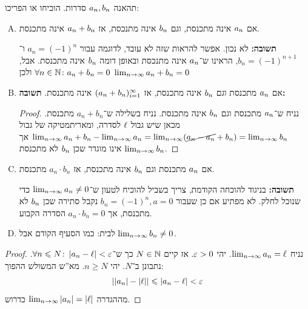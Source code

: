 \documentclass[name=רשימות חשבון דיפרנציאלי ואינטגרלי 1א]{../../../tex/classes/megasumPreamble}
\begin{document}
	
	תהאנה $a_n, b_n$ סדרות. הוכיחו או הפריכו:
	\begin{enumerate}[A.]
		\item אם $a_n$ אינה מתכנסת, וגם $b_n$ אינה מתנכסת, אז $a_n + b_n$ אינה מתכנסת.

		\textbf{תשובה: }לא נכון. אפשר להראות שזה לא עובד, לדוגמה עבור $a_n = (-1)^{n}$ ו־$b_n = (-1)^{n + 1}$, הראינו ש־$a_n$ אינה מתנכסת ובאופן דומה $b_n$ אינה מתכנסת. אבל, $\forall n \in \mathbb{N} \colon a_n + b_n = 0$ ולכן $\lim_{n \to \infty} a_n + b_n = 0$

		\item אם $a_n$ מתכנסת וגם $b_n$ אינה מתכנסת, אז $(a_n + b_n)_{i = 1}^{\infty}$ אינה מתכנסת. \textbf{תשובה: }

		\begin{proof}
			נניח ש־$a_n$ מתכנסת וגם $b_n$ אינה מתכנסת. נניח בשלילה ש־$a_n + b_n$ מתכנסת. מכאן שיש גבול $\ell$ לסדרה, ומאריתמטיקה של גבול $\lim_{n \to \infty} a_n + b_n - \lim_{n \to \infty} a_n = \lim_{n \to \infty} (\cancel{a_n - a_n} + b_n) = \lim_{n \to \infty} b_n$ אך $\lim_{n \to \infty} b_n$ אינו מוגדר שכן $b_n$ לא מתכנסת.
		\end{proof}
		\item אם $a_n$ מתכנסת וגם $b_n$ אינה מתכנסת, אז $a_n \cdot b_n$ מתכנסת.

		\textbf{תשובה: }בניגוד להוכחה הקודמת, צריך בשביל להוכיח לטעון ש־$\lim_{n \to \infty} a_n \neq 0$ כדי שנוכל לחלק. לא מפתיע אם כן שעבור $b_n = (-1)^{n}, a = 0$ נקבל סתירה שכן $b_n$ לא מתכנסת, אך $a_n \cdot b_n = 0$ הסדרה הקבוע.

		\item לבית: כמו הסעיף הקודם אבל $\lim_{n \to \infty} b_n \neq 0$.
	\end{enumerate}

	\begin{proof}
		נניח $\lim_{n \to \infty} a_n = \ell$. יהי $\eg > 0$. אז קיים $N \in \mathbb{N}$ כך ש־$\forall n \le N \co \sof {a_n - \ml} < \eg$. נתבונן ב־$N$. יהי $n \ge N$. מא''ש המשולש ההפוך:
		\[ \sof{\sof {a_n} - \sof \ml} \le \sof{a_n - \ml} < \eg \]
		מההגדרה $\lim_{n \to \infty} \left \lvert a_n \right \rvert = \left \lvert \ell \right \rvert$ כדרוש.
	\end{proof}
\end{document}

